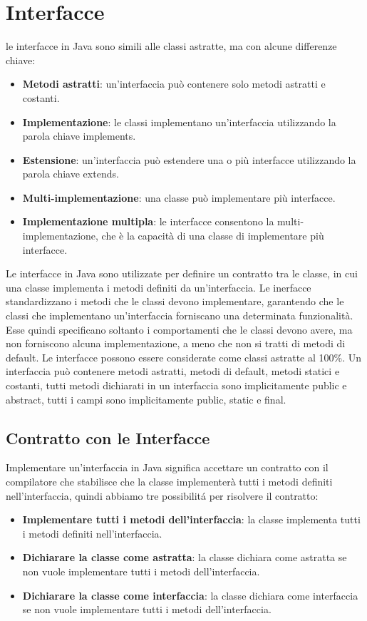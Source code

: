 \documentclass[11pt]{article}
\begin{document}
\section{Interfacce}
le interfacce in Java sono simili alle classi astratte, ma con alcune differenze chiave:
\begin{itemize}
    \item \textbf{Metodi astratti}: un'interfaccia può contenere solo metodi astratti e costanti.
    \item \textbf{Implementazione}: le classi implementano un'interfaccia utilizzando la parola chiave implements.
    \item \textbf{Estensione}: un'interfaccia può estendere una o più interfacce utilizzando la parola chiave extends.
    \item \textbf{Multi-implementazione}: una classe può implementare più interfacce.
    \item \textbf{Implementazione multipla}: le interfacce consentono la multi-implementazione, che è la capacità di una classe di implementare più interfacce.
    \end{itemize}
Le interfacce in Java sono utilizzate per definire un contratto tra le classe, in cui una classe implementa i metodi definiti da un'interfaccia.
Le inerfacce standardizzano i metodi che le classi devono implementare, garantendo che le classi che implementano un'interfaccia forniscano una determinata funzionalità.
Esse quindi specificano soltanto i comportamenti che le classi devono avere, ma non forniscono alcuna implementazione, a meno che non si tratti di metodi di default.
Le interfacce possono essere considerate come classi astratte al 100\%.
Un interfaccia può contenere metodi astratti, metodi di default, metodi statici e costanti, tutti metodi dichiarati in un interfaccia sono implicitamente public e abstract, tutti i campi sono implicitamente public, static e final.
\subsection{Contratto con le Interfacce}
Implementare un'interfaccia in Java significa accettare un contratto con il compilatore che stabilisce che la classe implementerà tutti i metodi definiti nell'interfaccia, quindi abbiamo tre possibilitá per risolvere il contratto:
\begin{itemize}
    \item \textbf{Implementare tutti i metodi dell'interfaccia}: la classe implementa tutti i metodi definiti nell'interfaccia.
    \item \textbf{Dichiarare la classe come astratta}: la classe dichiara come astratta se non vuole implementare tutti i metodi dell'interfaccia.
    \item \textbf{Dichiarare la classe come interfaccia}: la classe dichiara come interfaccia se non vuole implementare tutti i metodi dell'interfaccia.
    \end{itemize}
\end{document}
